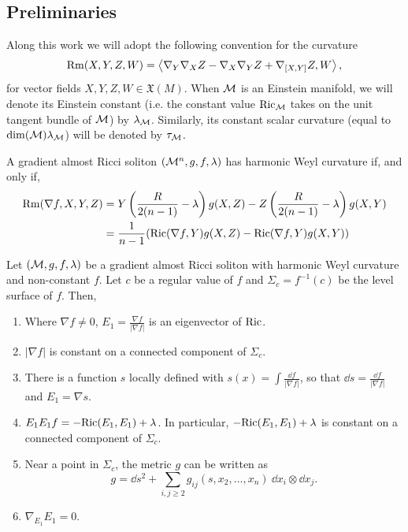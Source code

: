                \subsection{Preliminaries}
Along this work we will adopt the following convention for the curvature
\begin{align}
	\mathrm{Rm}(X,Y,Z,W)=\left\langle\nabla_{Y}\nabla_{X}Z-\nabla_{X}\nabla_{Y}Z+\nabla_{[X,Y]}Z,W\right\rangle,
\end{align}
for vector fields $X,Y,Z,W\in\mathfrak{X}(M)$. When $\mathcal{M}$ is an Einstein manifold, we will denote its Einstein constant (i.e. the constant value $\mathrm{Ric}_{\mathcal{M}}$ takes on the unit tangent bundle of $\mathcal{M}$) by $\lambda_{\mathcal{M}}$. Similarly, its constant scalar curvature (equal to $\dim(\mathcal{M}) \lambda_{\mathcal{M}}$) will be denoted by $\tau_{\mathcal{M}}$.


\begin{lema}\label{bari}
	A gradient almost Ricci soliton $(\mathcal{M}^n,g,f,\lambda)$ has harmonic Weyl curvature if, and only if,
	\begin{align*}
		\mathrm{Rm}(\nabla f,X,Y,Z)&=Y\left(\frac{R}{2(n-1)}-\lambda\right)g(X,Z)-Z\left(\frac{R}{2(n-1)}-\lambda\right)g(X,Y)\nonumber\\
		&=\frac{1}{n-1}(\mathrm{Ric}(\nabla f,Y)g(X,Z)-\mathrm{Ric}(\nabla f,Y)g(X,Y))
	\end{align*}
\end{lema}


\begin{lema}\label{caochen}
	Let $(\mathcal{M},g,f,\lambda)$ be a gradient almost Ricci soliton with harmonic Weyl curvature and non-constant $f$. Let $c$ be a regular value of $f$ and $\Sigma_{c}=f^{-1}(c)$ be the level surface of $f$. Then,
	\begin{enumerate}
		\item Where $\nabla f\neq0$, $E_{1}=\frac{\nabla f}{|\nabla f|}$ is an eigenvector of $\mathrm{Ric}$.
		\item $|\nabla f|$ is constant on a connected component of $\Sigma_{c}$.
		\item There is a function $s$ locally defined with $s(x)=\int\frac{\dd f}{|\nabla f|}$, so that $\dd s=\frac{\dd f}{|\nabla f|}$ and $E_{1}=\nabla s$.
		\item\label{cao4} $E_{1}E_{1}f=-\mathrm{Ric}(E_{1},E_{1})+\lambda$. In particular, $-\mathrm{Ric}(E_{1},E_{1})+\lambda$ is constant on a connected component of $\Sigma_{c}$.
		\item Near a point in $\Sigma_{c}$, the metric $g$ can be written as
		\[
			g=\dd s^2+\sum_{i,j\geq2}g_{ij}(s,x_{2},\ldots,x_{n}) \ \dd x_{i}\otimes \dd x_{j}.
		\]
		\item $\nabla_{E_{1}}E_{1}=0$.
	\end{enumerate}
\end{lema}

